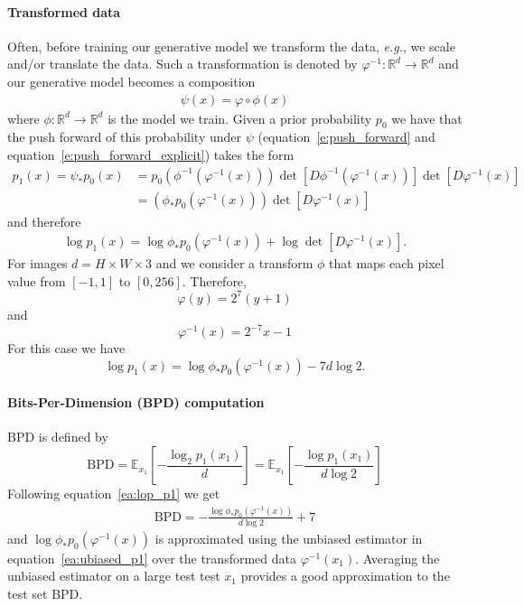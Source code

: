 \documentclass{article}
\makeatletter
\newcommand{\parr}[1]{\left (#1\right )}
\newcommand{\brac}[1]{\left [#1\right ]}
\newcommand{\Real}{\mathbb R}
\newcommand{\too}{\rightarrow}
\newcommand{\eg}{{e.g.}}
\def\eqref#1{equation~\ref{#1}}
\newcommand{\E}{\mathbb{E}}
\renewcommand*{\eg}{{\it e.g.}\@\xspace}
\makeatother
\begin{document}
\paragraph{Transformed data}
Often, before training our generative model we transform the data, \eg, we scale and/or translate the data. Such a transformation is denoted by $\varphi^{-1}:\Real^d\too\Real^d$ and our generative model becomes a composition 
\begin{align*}
    \psi(x) = \varphi \circ \phi(x)
\end{align*}
where $\phi:\Real^d \too \Real^d$ is the model we train. Given a prior probability $p_0$ we have that the push forward of this probability under $\psi$  (\eqref{e:push_forward} and \eqref{e:push_forward_explicit}) takes the form
\begin{align*}
    p_1(x) = \psi_* p_0 (x) &= p_0(\phi^{-1}(\varphi^{-1}(x)))\det\brac{D\phi^{-1}(\varphi^{-1}(x))}\det\brac{D\varphi^{-1}(x)}\\ 
    &= \parr{\phi_* p_0 (\varphi^{-1}(x))} \det\brac{D\varphi^{-1}(x)}
\end{align*}
and therefore
\begin{align*}
    \log p_1(x) = \log \phi_* p_0 (\varphi^{-1}(x)) +  \log \det\brac{D\varphi^{-1}(x)}.
\end{align*}
For images $d=H\times W\times 3$ and we consider a transform $\phi$ that maps each pixel value from $[-1,1]$ to $[0,256]$. Therefore, 
\begin{equation*}
    \varphi(y) = 2^7(y+1)
\end{equation*}
and
\begin{equation*}
    \varphi^{-1}(x) = 2^{-7}x  - 1
\end{equation*}
For this case we have
\begin{equation}\label{ea:lop_p1}
\log p_1(x) = \log \phi_* p_0 (\varphi^{-1}(x)) - 7d\log 2.
\end{equation}

\paragraph{Bits-Per-Dimension (BPD) computation}
BPD is defined by
\begin{equation}
    \mathrm{BPD} = \E_{x_1}\brac{ -\frac{\log_2 p_1(x_1)}{d}} = \E_{x_1}\brac{ -\frac{\log p_1(x_1)}{d\log 2}}
\end{equation}
Following \eqref{ea:lop_p1} we get
\begin{align*}
    \mathrm{BPD} = -\frac{\log \phi_* p_0 (\varphi^{-1}(x))}{d\log 2 } + 7
\end{align*}
and $\log \phi_* p_0 (\varphi^{-1}(x))$ is approximated using the unbiased estimator in \eqref{ea:ubiased_p1} over the transformed data $\varphi^{-1}(x_1)$. Averaging the unbiased estimator on a large test test $x_1$ provides a good approximation to the test set BPD.
\end{document}
